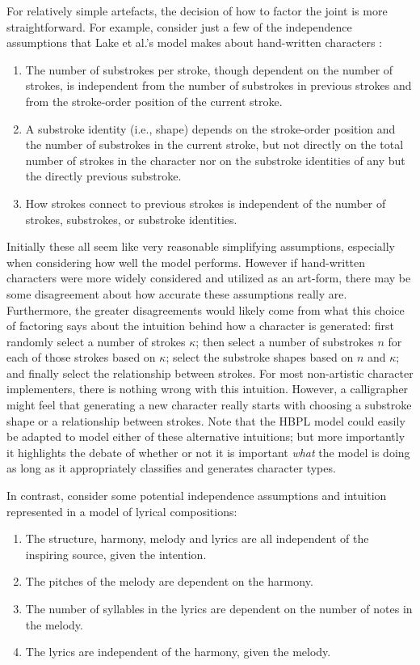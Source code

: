 \documentclass[phd,electronic,oneside,twosidetoc,letterpaper,chaptercenter,parttop,lof,lot]{byumsphd}
\begin{document}
For relatively simple artefacts, the decision of how to factor the joint is more straightforward. For example, consider just a few of the independence assumptions that Lake et al.'s model makes about hand-written characters \cite{Lake2015}:

\begin{enumerate}  
\item The number of substrokes per stroke, though dependent on the number of strokes, is independent from the number of substrokes in previous strokes and from the stroke-order position of the current stroke.
\item A substroke identity (i.e., shape) depends on the stroke-order position and the number of substrokes in the current stroke, but not directly on the total number of strokes in the character nor on the substroke identities of any but the directly previous substroke.
\item How strokes connect to previous strokes is independent of the number of strokes, substrokes, or substroke identities.
\end{enumerate}

\noindent Initially these all seem like very reasonable simplifying assumptions, especially when considering how well the model performs. However if hand-written characters were more widely considered and utilized as an art-form, there may be some disagreement about how accurate these assumptions really are. Furthermore, the greater disagreements would likely come from what this choice of factoring says about the intuition behind how a character is generated: first randomly select a number of strokes $\kappa$; then select a number of substrokes $n$ for each of those strokes based on $\kappa$; select the substroke shapes based on $n$ and $\kappa$; and finally select the relationship between strokes. For most non-artistic character implementers, there is nothing wrong with this intuition. However, a calligrapher might feel that generating a new character really starts with choosing a substroke shape or a relationship between strokes. Note that the HBPL model could easily be adapted to model either of these alternative intuitions; but more importantly it highlights the debate of whether or not it is important \emph{what} the model is doing as long as it appropriately classifies and generates character types.

In contrast, consider some potential independence assumptions and intuition represented in a model of lyrical compositions:

\begin{enumerate}  
\item The structure, harmony, melody and lyrics are all independent of the inspiring source, given the intention.
\item The pitches of the melody are dependent on the harmony.
\item The number of syllables in the lyrics are dependent on the number of notes in the melody.
\item The lyrics are independent of the harmony, given the melody.
\end{enumerate}
\end{document}
